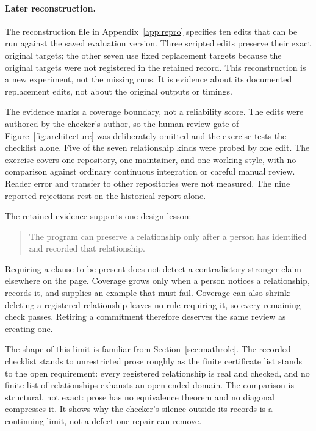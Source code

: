 \documentclass[11pt]{article}
\begin{document}
\paragraph{Later reconstruction.}
The reconstruction file in Appendix~\ref{app:repro} specifies ten edits that can be run
against the saved evaluation version.  Three scripted edits preserve
their exact original targets; the other seven use fixed replacement targets
because the original targets were not registered in the retained record.
This reconstruction is a new experiment, not the missing runs.  It is evidence
about its documented replacement edits, not about the original outputs or timings.

The evidence marks a coverage boundary, not a reliability score.  The edits were authored
by the checker's author, so the human review gate of
Figure~\ref{fig:architecture} was deliberately omitted and the exercise tests
the checklist alone.  Five of the seven relationship kinds were probed by one
edit.  The exercise covers one repository, one maintainer, and one working
style, with no comparison against ordinary continuous integration or careful
manual review.  Reader error and transfer to other repositories were not
measured.  The nine reported rejections rest on the historical report alone.

\begin{samepage}
\noindent The retained evidence supports one design lesson:

\begin{quote}
The program can preserve a relationship only after a person has identified
and recorded that relationship.
\end{quote}
\end{samepage}

Requiring a clause to be present does not detect a contradictory stronger
claim elsewhere on the page.  Coverage grows only when a person notices a
relationship, records it, and supplies an example that must fail.  Coverage can
also shrink: deleting a registered relationship leaves no rule requiring it,
so every remaining check passes.
Retiring a commitment therefore deserves the same review as creating one.

The shape of this limit is familiar from Section~\ref{sec:mathrole}.  The
recorded checklist stands to unrestricted prose roughly as the finite
certificate list stands to the open requirement: every registered
relationship is real and checked, and no finite list of relationships
exhausts an open-ended domain.  The comparison is structural, not exact: prose
has no equivalence theorem and no diagonal compresses it.  It shows why the
checker's silence outside its records is a continuing limit, not a defect one
repair can remove.
\end{document}
